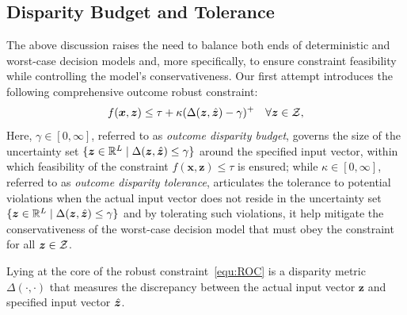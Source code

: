 \documentclass[mnsc, nonblindrev]{informswp}
\newcommand{\1}[1]{\mathds{1}{\left(#1\right)}}
\begin{document}
\subsection*{Disparity Budget and Tolerance}

The above discussion raises the need to balance both ends of deterministic and worst-case decision models and, more specifically, to ensure constraint feasibility while controlling the model's conservativeness. Our first attempt introduces the following comprehensive outcome robust constraint:
\begin{equation}
\label{equ:ROC}
f(\bm x,\bm z) \leq \tau + \kappa (\Delta(\bm z,\hat{\bm{z}}) - \gamma)^+ ~~~\forall \bm z \in \mathcal{Z},
\end{equation}
Here, $\gamma \in [0,\infty]$, referred to as \textit{outcome disparity budget}, governs the size of the uncertainty set $\{\bm z \in \mathbb{R}^L \;|\; \Delta(\bm z, \hat{\bm{z}}) \leq \gamma\}$ around the specified input vector, within which feasibility of the constraint $f(\bm x, \bm z) \leq \tau$ is ensured; while $\kappa \in [0, \infty]$, referred to as \textit{outcome disparity tolerance}, articulates the tolerance to potential violations when the actual input vector does not reside in the uncertainty set $\{\bm z \in \mathbb{R}^L \;|\; \Delta(\bm z, \hat{\bm{z}}) \leq \gamma\}$ and by tolerating such violations, it help mitigate the conservativeness of the worst-case decision model that must obey the constraint for all $\bm z \in \mathcal{Z}$. 

Lying at the core of the robust constraint~\eqref{equ:ROC} is a disparity metric $\Delta(\cdot,\cdot)$ that measures the discrepancy between the actual input vector $\bm z$ and specified input vector $\hat{\bm{z}}$. 
\end{document}
